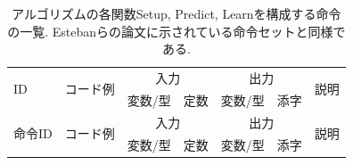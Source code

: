 \documentclass[11pt,oneside,openany,report]{jsbook}
\begin{document}
\begin{center}
  {\renewcommand\arraystretch{1.9}
    {\scriptsize
      \begin{longtable}{l|l|lc|lc|l}
        \caption{アルゴリズムの各関数Setup, Predict, Learnを構成する命令の一覧. Estebanらの論文\cite{automl_zero}に示されている命令セットと同様である. }
        \\
        \hline
        \multirow{2}{*}{ID}
             & \multirow{2}{*}{コード例}
             & \multicolumn{2}{c|}{入力}                    & \multicolumn{2}{c|}{出力}
             & \multirow{2}{*}{説明}                                                                                                                                                                          \\
             &                                            & 変数/型                    & 定数              & 変数/型       & 添字                                                                                     \\
        \hline \hline
        \endfirsthead
        \hline
        \multirow{2}{*}{命令ID}
             & \multirow{2}{*}{コード例}
             & \multicolumn{2}{c|}{入力}                    & \multicolumn{2}{c|}{出力}
             & \multirow{2}{*}{説明}                                                                                                                                                                          \\
             &                                            & 変数/型                    & 定数              & 変数/型       & 添字                                                                                     \\
        \hline \hline
        \endhead


\end{longtable}}}
\end{center}
\end{document}
